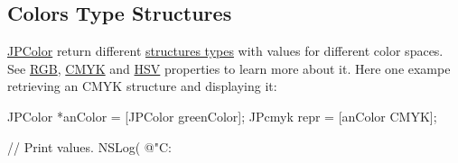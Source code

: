 \subsection*{Colors Type Structures}

\hyperlink{interface_j_p_color}{JPColor} return different \hyperlink{_j_p_color_types_8h}{structures types} with values for different color spaces. See \hyperlink{interface_j_p_color_a659b3f9caaf643fc6e9643b8470014f6}{RGB}, \hyperlink{interface_j_p_color_a06d575f03ff1692f65871d0485b62ae6}{CMYK} and \hyperlink{interface_j_p_color_a00bf425621fe08bd7eb6154be6b5a8a9}{HSV} properties to learn more about it. Here one exampe retrieving an CMYK structure and displaying it: 
\begin{DoxyCode}
 JPColor *anColor = [JPColor greenColor];
 JPcmyk repr = [anColor CMYK];
 
 // Print values.
 NSLog( @"C:%
\end{DoxyCode}
  